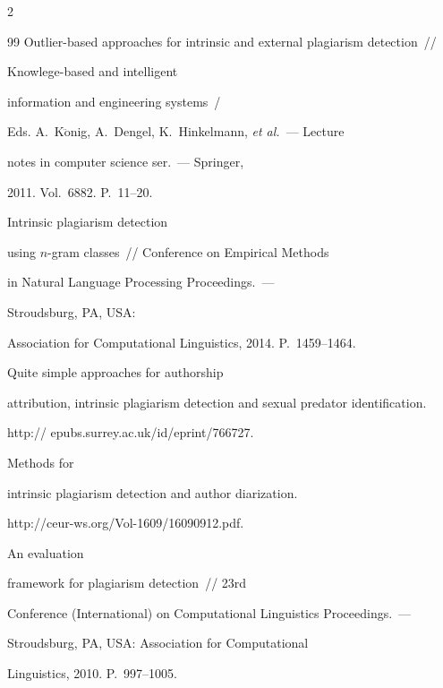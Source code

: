 \begin{multicols}{2}
{{\begin{thebibliography}{99}
Outlier-based approaches for intrinsic and external plagiarism detection~// 

Knowlege-based and intelligent 

information and engineering systems~/

Eds. A.~K$\ddot{\mbox{o}}$nig, A.~Dengel, K.~Hinkelmann, \textit{et al.}~--- Lecture 

notes in computer science ser.~--- Springer, 

2011. Vol.~6882.  P.~11--20.




 Intrinsic plagiarism detection 

using $n$-gram classes~// Conference on Empirical Methods 

in Natural Language Processing Proceedings.~--- 

Stroudsburg, PA, USA: 

Association for Computational Linguistics, 2014. P.~1459--1464.




 Quite simple approaches for authorship 

attribution, intrinsic plagiarism detection and sexual predator identification. 

{\sf http:// epubs.surrey.ac.uk/id/eprint/766727}.




 Methods for 

intrinsic plagiarism detection and author diarization. 

{\sf http://ceur-ws.org/Vol-1609/16090912.pdf}.




 An evaluation 

framework for plagiarism detection~// 23rd  

Conference (International) on Computational Linguistics Proceedings.~--- 

Stroudsburg, PA, USA: Association for Computational 

Linguistics, 2010. P.~997--1005.

 \end{thebibliography}



 }

 }



\end{multicols}



